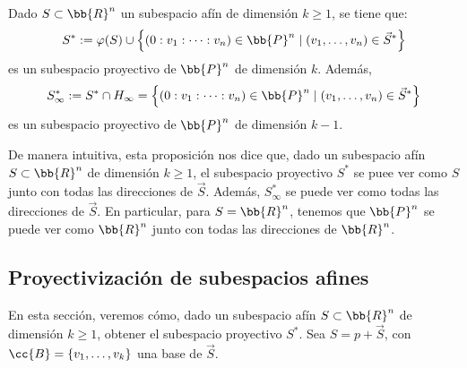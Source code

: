 \begin{prop}
    Dado $S\subset \bb{R}^n$ un subespacio afín de dimensión $k\geq 1$,
    se tiene que:
    \begin{equation*}
        S^\ast := \varphi(S) \cup  \left\{(0:v_1:\dots:v_n)\in \bb{P}^n \mid (v_1,\dots,v_n)\in \vec{S}^\ast\right\}
    \end{equation*}
    es un subespacio proyectivo de $\bb{P}^n$ de dimensión $k$. Además,
    \begin{equation*}
        S^\ast_\infty := S^\ast\cap H_{\infty} = \left\{(0:v_1:\dots:v_n)\in \bb{P}^n \mid (v_1,\dots,v_n)\in \vec{S}^\ast\right\}
    \end{equation*}
    es un subespacio proyectivo de $\bb{P}^n$ de dimensión $k-1$.
\end{prop}
De manera intuitiva, esta proposición nos dice que, dado un subespacio afín $S\subset \bb{R}^n$ de dimensión $k\geq 1$,
el subespacio proyectivo $S^\ast$ se puee ver como $S$ junto con todas las direcciones de $\vec{S}$.
Además, $S^\ast_\infty$ se puede ver como todas las direcciones de $\vec{S}$. En particular, para $S=\bb{R}^n$,
tenemos que $\bb{P}^n$ se puede ver como $\bb{R}^n$ junto con todas las direcciones de $\bb{R}^n$.

\subsection{Proyectivización de subespacios afines} %

En esta sección, veremos cómo, dado un subespacio afín $S\subset \bb{R}^n$ de dimensión $k\geq 1$, obtener el subespacio proyectivo $S^\ast$.
Sea $S=p+\vec{S}$, con $\cc{B}= \{v_1,\dots,v_k\}$ una base de $\vec{S}$.

